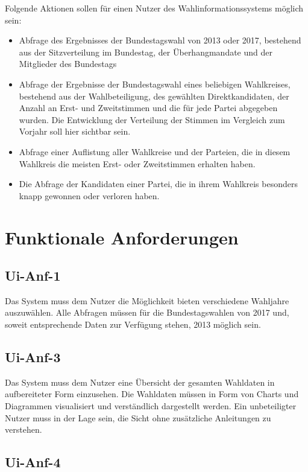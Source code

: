 \documentclass[a4paper]{scrreprt}
\begin{document}
Folgende Aktionen sollen für einen Nutzer des Wahlinformationssystems möglich sein: 

\begin{itemize}
\item Abfrage des Ergebnisses der Bundestagswahl von 2013 oder 2017, bestehend aus der Sitzverteilung im Bundestag, der Überhangmandate und der Mitglieder des Bundestags
\item Abfrage der Ergebnisse der Bundestagswahl eines beliebigen Wahlkreises, bestehend aus der Wahlbeteiligung, des gewählten Direktkandidaten, der Anzahl an Erst- und Zweitstimmen und die für jede Partei abgegeben wurden. Die Entwicklung der Verteilung der Stimmen im Vergleich zum Vorjahr soll hier sichtbar sein. 
\item Abfrage einer Auflistung aller Wahlkreise und der Parteien, die in diesem Wahlkreis die meisten Erst- oder Zweitstimmen erhalten haben. 
\item Die Abfrage der Kandidaten einer Partei, die in ihrem Wahlkreis besonders knapp gewonnen oder verloren haben.
\end{itemize}

\section{Funktionale Anforderungen}

\subsection{Ui-Anf-1}

Das System muss dem Nutzer die Möglichkeit bieten verschiedene Wahljahre auszuwählen. Alle Abfragen müssen für die Bundestagswahlen von 2017 und, soweit entsprechende Daten zur Verfügung stehen, 2013 möglich sein. 

\subsection{Ui-Anf-3}

Das System muss dem Nutzer eine Übersicht der gesamten Wahldaten in aufbereiteter Form einzusehen. Die Wahldaten  müssen in Form von Charts und Diagrammen visualisiert und verständlich dargestellt werden. Ein unbeteiligter Nutzer muss in der Lage sein, die Sicht ohne zusätzliche Anleitungen zu verstehen.

\subsection{Ui-Anf-4}
\end{document}
